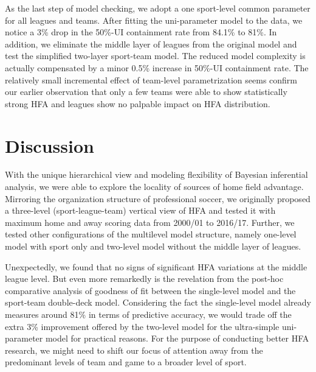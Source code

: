 \documentclass[USenglish]{article}
\begin{document}
As the last step of model checking, we adopt a one sport-level common parameter for all leagues and teams. After fitting the uni-parameter model to the data, we notice a 3\%  drop in the 50\%-UI containment rate from 84.1\% to 81\%.
In addition, we eliminate the middle layer of leagues from the original model and test the simplified two-layer sport-team model. The reduced model complexity is actually compensated by a minor 0.5\% increase in 50\%-UI containment rate.  
The relatively small incremental effect of team-level parametrization seems confirm our earlier observation that only a few teams were able to show statistically strong HFA and leagues show no palpable impact on HFA distribution.



\section{Discussion}

With the unique hierarchical view and modeling flexibility of Bayesian inferential analysis, we were able to explore the locality of sources of home field advantage. Mirroring the organization structure of professional soccer, we originally proposed a three-level (sport-league-team) vertical view of HFA and tested it with maximum home and away scoring data from 2000/01 to 2016/17. Further, we tested other configurations of the multilevel model structure, namely one-level model with sport only and two-level model without the middle layer of leagues. 



Unexpectedly, we found that no signs of significant HFA variations at the middle league level. But even more remarkedly is the revelation from the post-hoc comparative analysis of goodness of fit between the single-level model and the sport-team double-deck model. Considering the fact the single-level model already measures around 81\% in terms of predictive accuracy, we would trade off the extra 3\% improvement offered by the two-level model for the ultra-simple uni-parameter model for practical reasons. For the purpose of conducting better HFA research, we might need to shift our focus of attention away from the predominant levels of team and game to a broader level of sport.
\end{document}
